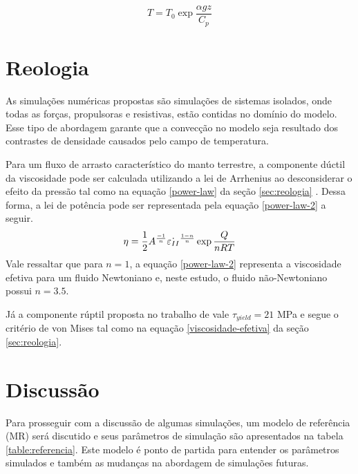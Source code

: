\begin{equation}{}\label{eq:adiabatic-temp}
  T = T_0 \exp{\frac{\alpha g z}{C_p}}
\end{equation}


\section{Reologia}

As simulações numéricas propostas são simulações de sistemas isolados, onde todas as forças, propulsoras e resistivas, estão contidas no domínio do modelo. Esse tipo de abordagem garante que a convecção no modelo seja resultado dos contrastes de densidade causados pelo campo de temperatura.

Para um fluxo de arrasto característico do manto terrestre, a componente dúctil da viscosidade pode ser calculada utilizando a lei de Arrhenius ao desconsiderar o efeito da pressão tal como na equação \ref{power-law} da seção \ref{sec:reologia} \citep{vankeken2008community}. Dessa forma, a lei de potência pode ser representada pela equação \ref{power-law-2} a seguir.
\begin{equation}{\label{power-law-2}}
	\eta = \frac{1}{2} A^{\frac{-1}{n}} \dot{\varepsilon_{II}}^{\frac{1-n}{n}} \exp{\frac{Q}{nRT}} 
\end{equation}
Vale ressaltar que para $n=1$, a equação \ref{power-law-2} representa a viscosidade efetiva para um fluido Newtoniano e, neste estudo, o fluido não-Newtoniano possui $n=3.5$.

Já a componente rúptil proposta no trabalho de \citet{strak2021thermo} vale $\tau_{yield}=21$ MPa e segue o critério de von Mises tal como na equação \ref{viscosidade-efetiva} da seção \ref{sec:reologia}.

\section{Discussão}

Para prosseguir com a discussão de algumas simulações, um modelo de referência (MR) será discutido e seus parâmetros de simulação são apresentados na tabela \ref{table:referencia}. Este modelo é ponto de partida para entender os parâmetros simulados e também as mudanças na abordagem de simulações futuras. 

